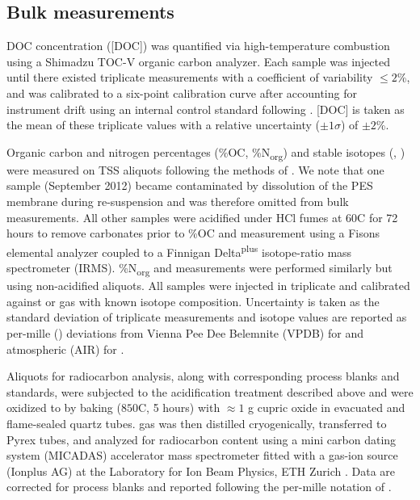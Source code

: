 \subsection{Bulk measurements}

DOC concentration ([DOC]) was quantified via high-temperature combustion using a Shimadzu TOC-V organic carbon analyzer. Each sample was injected until there existed triplicate measurements with a coefficient of variability $\leq 2$\%, and was calibrated to a six-point calibration curve after accounting for instrument drift using an internal control standard following \citet{Mann:2012kp}. [DOC] is taken as the mean of these triplicate values with a relative uncertainty ($\pm 1 \sigma$) of $\pm 2$\%.

Organic carbon and nitrogen percentages (\%OC, \%N\textsubscript{org}) and stable isotopes (, ) were measured on TSS aliquots following the methods of \citet{Whiteside:2011jea}. We note that one sample (September 2012) became contaminated by dissolution of the PES membrane during re-suspension and was therefore omitted from bulk measurements. All other samples were acidified under HCl fumes at $60$\textdegree C for 72 hours to remove carbonates prior to \%OC and  measurement using a Fisons elemental analyzer coupled to a Finnigan Delta\textsuperscript{plus} isotope-ratio mass spectrometer (IRMS). \%N\textsubscript{org} and  measurements were performed similarly but using non-acidified aliquots. All samples were injected in triplicate and calibrated against  or  gas with known isotope composition. Uncertainty is taken as the standard deviation of triplicate measurements and isotope values are reported as per-mille (\textperthousand) deviations from Vienna Pee Dee Belemnite (VPDB) for  and atmospheric  (AIR) for .

Aliquots for radiocarbon analysis, along with corresponding process blanks and standards, were subjected to the acidification treatment described above and were oxidized to  by baking ($850$\textdegree C, 5 hours) with $\approx 1$ g cupric oxide in evacuated and flame-sealed quartz tubes.  gas was then distilled cryogenically, transferred to Pyrex tubes, and analyzed for radiocarbon content using a mini carbon dating system (MICADAS) accelerator mass spectrometer fitted with a gas-ion source (Ionplus AG) at the Laboratory for Ion Beam Physics, ETH Zurich \citep{Christl:2013ks}. Data are corrected for process blanks and reported following the  per-mille notation of \citet{Stuiver:1977uh}.

